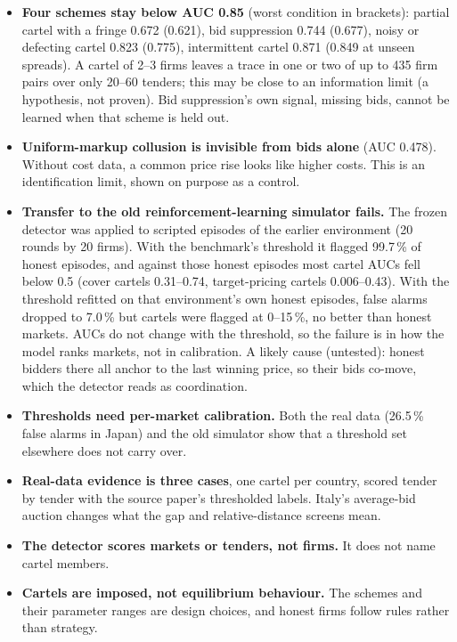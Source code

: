 \documentclass[11pt,a4paper]{article}
\begin{document}
\begin{itemize}
\item \textbf{Four schemes stay below AUC 0.85} (worst condition in brackets): partial cartel with a fringe 0.672 (0.621), bid suppression 0.744 (0.677), noisy or defecting cartel 0.823 (0.775), intermittent cartel 0.871 (0.849 at unseen spreads). A cartel of 2--3 firms leaves a trace in one or two of up to 435 firm pairs over only 20--60 tenders; this may be close to an information limit (a hypothesis, not proven). Bid suppression's own signal, missing bids, cannot be learned when that scheme is held out.
\item \textbf{Uniform-markup collusion is invisible from bids alone} (AUC 0.478). Without cost data, a common price rise looks like higher costs. This is an identification limit, shown on purpose as a control.
\item \textbf{Transfer to the old reinforcement-learning simulator fails.} The frozen detector was applied to scripted episodes of the earlier environment (20 rounds by 20 firms). With the benchmark's threshold it flagged 99.7\,\% of honest episodes, and against those honest episodes most cartel AUCs fell below 0.5 (cover cartels 0.31--0.74, target-pricing cartels 0.006--0.43). With the threshold refitted on that environment's own honest episodes, false alarms dropped to 7.0\,\% but cartels were flagged at 0--15\,\%, no better than honest markets. AUCs do not change with the threshold, so the failure is in how the model ranks markets, not in calibration. A likely cause (untested): honest bidders there all anchor to the last winning price, so their bids co-move, which the detector reads as coordination.
\item \textbf{Thresholds need per-market calibration.} Both the real data (26.5\,\% false alarms in Japan) and the old simulator show that a threshold set elsewhere does not carry over.
\item \textbf{Real-data evidence is three cases}, one cartel per country, scored tender by tender with the source paper's thresholded labels. Italy's average-bid auction changes what the gap and relative-distance screens mean.
\item \textbf{The detector scores markets or tenders, not firms.} It does not name cartel members.
\item \textbf{Cartels are imposed, not equilibrium behaviour.} The schemes and their parameter ranges are design choices, and honest firms follow rules rather than strategy.
\end{itemize}
\end{document}
